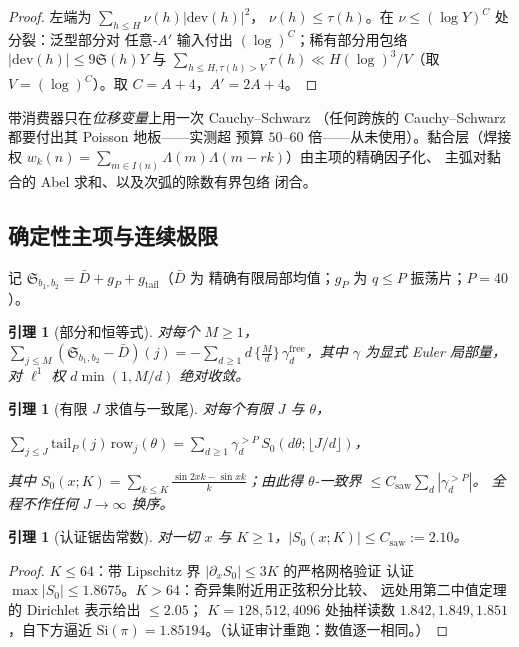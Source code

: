 \documentclass[11pt]{article}
\numberwithin{equation}{section}
\newtheorem{lemma}[theorem]{引理}
\theoremstyle{definition}
\theoremstyle{remark}
\newcommand{\LL}{\Lambda}
\newcommand{\SSS}{\mathfrak{S}}
\newcommand{\Si}{\mathrm{Si}}
\begin{document}
\begin{proof}
左端为 $\sum_{h\le H}\nu(h)|\mathrm{dev}(h)|^2$，
$\nu(h)\le\tau(h)$。在 $\nu\le(\log Y)^{C}$ 处分裂：泛型部分对
任意-$A'$ 输入付出 $(\log)^{C}$；稀有部分用包络
$|\mathrm{dev}(h)|\le9\SSS(h)Y$ 与
$\sum_{h\le H,\tau(h)>V}\tau(h)\ll H(\log)^3/V$（取
$V=(\log)^{C}$）。取 $C=A+4$，$A'=2A+4$。
\end{proof}

\noindent 带消费器只在\emph{位移变量}上用一次 Cauchy--Schwarz
（任何跨族的 Cauchy--Schwarz 都要付出其 Poisson 地板——实测超
预算 $50$--$60$ 倍——从未使用）。黏合层（焊接权
$w_k(n)=\sum_{m\in I(n)}\LL(m)\LL(m-rk)$）由主项的精确因子化、
主弧对黏合的 Abel 求和、以及次弧的除数有界包络
\cite[命题~5.4，附录~A]{MRT} 闭合。

\subsection{确定性主项与连续极限}\label{s:fm:mains}

记 $\SSS_{b_1,b_2}=\bar D+g_P+g_{\mathrm{tail}}$（$\bar D$ 为
精确有限局部均值；$g_P$ 为 $q\le P$ 振荡片；$P=40$）。

\begin{lemma}[部分和恒等式]\label{l:PS}
对每个 $M\ge1$，
$\displaystyle\sum_{j\le M}(\SSS_{b_1,b_2}-\bar D)(j)=
-\sum_{d\ge1}d\,\bigl\{\tfrac Md\bigr\}\,
\gamma^{\mathrm{free}}_d$，其中 $\gamma$ 为显式 Euler 局部量，
对 $\ell^1$ 权 $d\min(1,M/d)$ 绝对收敛。
\end{lemma}

\begin{lemma}[有限 $J$ 求值与一致尾]\label{l:E3}
对每个有限 $J$ 与 $\theta$，
\begin{center}   
$\sum_{j\le J}\mathrm{tail}_P(j)\,\mathrm{row}_j(\theta)
=\sum_{d\ge1}\gamma_d^{>P}\,S_0(d\theta;\lfloor J/d\rfloor)$，
\end{center}
其中 $S_0(x;K)=\sum_{k\le K}\frac{\sin2xk-\sin xk}{k}$；由此得
$\theta$-一致界 $\le C_{\mathrm{saw}}\sum_d|\gamma_d^{>P}|$。
全程不作任何 $J\to\infty$ 换序。
\end{lemma}

\begin{lemma}[认证锯齿常数]\label{l:S0}
对一切 $x$ 与 $K\ge1$，$|S_0(x;K)|\le C_{\mathrm{saw}}:=2.10$。
\end{lemma}

\begin{proof}
$K\le64$：带 Lipschitz 界 $|\partial_xS_0|\le3K$ 的严格网格验证
认证 $\max|S_0|\le1.8675$。$K>64$：奇异集附近用正弦积分比较、
远处用第二中值定理的 Dirichlet 表示给出 $\le2.05$；
$K=128,512,4096$ 处抽样读数 $1.842,1.849,1.851$，自下方逼近
$\Si(\pi)=1.85194$。（认证审计重跑：数值逐一相同。）
\end{proof}
\end{document}
